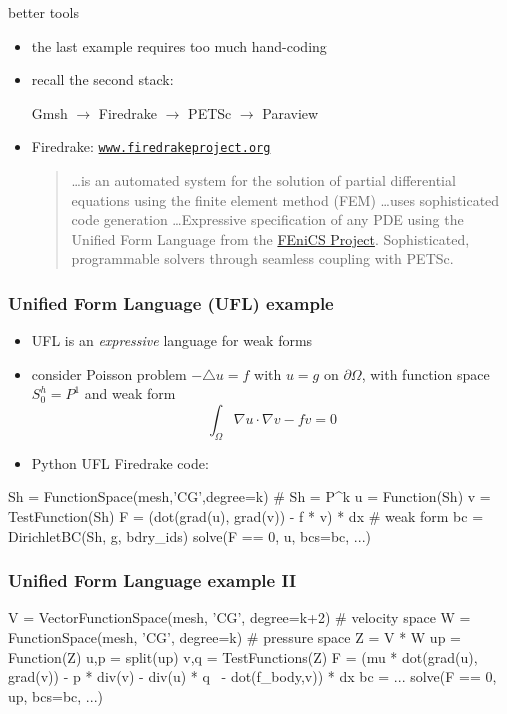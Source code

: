 \documentclass[hide notes,intlimits,usenames,dvipsnames]{beamer}
\newcommand{\grad}{\nabla}
\begin{document}
\begin{frame}{better tools}
\begin{itemize}
\item the last example requires too much hand-coding
\item recall the second stack:
\begin{center}
Gmsh $\to$ Firedrake $\to$ PETSc $\to$ Paraview %
\end{center}
\item Firedrake: \quad \href{https://www.firedrakeproject.org/}{\color{blue}\texttt{www.firedrakeproject.org}}
\begin{quote}
\dots is an automated system for the solution of partial differential equations using the finite element method (FEM) \dots uses sophisticated code generation \dots Expressive specification of any PDE using the Unified Form Language from the \href{https://fenicsproject.org/}{\color{blue} FEniCS Project}.  Sophisticated, programmable solvers through seamless coupling with PETSc.
\end{quote}
\end{itemize}
\end{frame}


\begin{frame}[fragile]
\frametitle{Unified Form Language (UFL) example}

\begin{itemize}
\item UFL is an \emph{expressive} language for weak forms
\item consider Poisson problem $-\triangle u = f$ with $u=g$ on $\partial\Omega$, with function space $S_0^h = P^1$ and weak form
    $$\int_\Omega \grad u \cdot \grad v - f v = 0$$
\item Python UFL Firedrake code:
\end{itemize}
\begin{code}
Sh = FunctionSpace(mesh,'CG',degree=k)      # Sh = P^k
u = Function(Sh)
v = TestFunction(Sh)
F = (dot(grad(u), grad(v)) - f * v) * dx    # weak form
bc = DirichletBC(Sh, g, bdry_ids)
solve(F == 0, u, bcs=bc, ...)
\end{code}
\end{frame}


\begin{frame}[fragile]
\frametitle{Unified Form Language example II}

\begin{scode}
V = VectorFunctionSpace(mesh, 'CG', degree=k+2)  # velocity space
W = FunctionSpace(mesh, 'CG', degree=k)          # pressure space
Z = V * W
up = Function(Z)
u,p = split(up)
v,q = TestFunctions(Z)
F = (mu * dot(grad(u), grad(v)) - p * div(v) - div(u) * q \
     - dot(f_body,v)) * dx
bc = ...
solve(F == 0, up, bcs=bc, ...)
\end{scode}
\end{frame}
\end{document}
